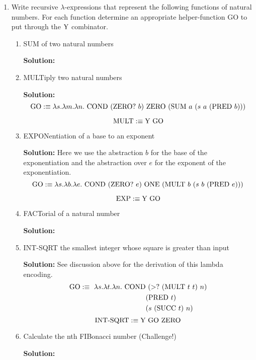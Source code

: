 \documentclass[11pt]{report}
\begin{document}
\begin{enumerate}
	
	\item Write recursive $\lambda$-expressions that represent the following functions of natural numbers. For each function determine an appropriate helper-function GO to put through the $\text{Y}$ combinator. 
	
		\begin{enumerate}
			\item SUM of two natural numbers
			
			{\bf Solution:}

			\item MULTiply two natural numbers
			
			{\bf Solution:}
			$$\GO :\equiv \lambda s. \lambda m. \lambda n. \ \COND \ (\ISITZERO \ b) \ \ZERO \ (\SUM \ a \ (s \ a \ (\PRED \ b))) $$

			$$\MULT :\equiv \YCOMB \ \GO$$

			\item EXPONentiation of a base to an exponent
			
			{\bf Solution:}
			Here we use the abstraction $b$ for the base of the exponentiation and the abstraction over $e$ for the exponent of the exponentiation.
			$$\GO :\equiv \lambda s. \lambda b. \lambda e. \ \COND \ (\ISITZERO \ e) \ \ONE \ (\MULT \ b \ (s \ b \ (\PRED \ e))) $$

			$$\EXP :\equiv \YCOMB \ \GO$$

			\item FACTorial of a natural number
			
			{\bf Solution:}
			
			\item INT-SQRT the smallest integer whose square is greater than input
			
			{\bf Solution:} See discussion above for the derivation of this lambda encoding. 	
			\begin{align*}
				\text{GO}:\equiv \  \lambda s. \lambda t. \lambda n. \ \text{COND} &\ (>? \ (\text{MULT} \ t \ t) \ n) \\
				&(\text{PRED} \ t) \\
				&(s \ (\text{SUCC} \ t) \ n)
			\end{align*}
			$$\text{INT-SQRT} :\equiv \text{Y} \ \text{GO} \ \text{ZERO}$$

			
			\item Calculate the nth FIBonacci number (Challenge!)
			
			{\bf Solution:}


\end{enumerate}
\end{enumerate}
\end{document}
